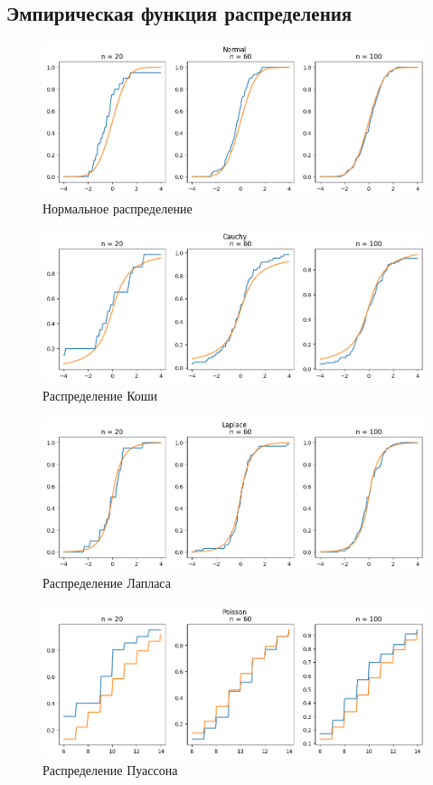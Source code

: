 \subsection{Эмпирическая функция распределения}

\begin{figure}[H]
	\includegraphics[width=\textwidth]{tasks/4/res/1.png}
	\caption{Нормальное распределение} 
\end{figure}
	
\begin{figure}[H]
	\includegraphics[width=\textwidth]{tasks/4/res/2.png}
	\caption{Распределение Коши} 
\end{figure}
	
\begin{figure}[H]
	\includegraphics[width=\textwidth]{tasks/4/res/3.png}
	\caption{Распределение Лапласа} 
\end{figure}
	
\begin{figure}[H]
	\includegraphics[width=\textwidth]{tasks/4/res/4.png}
	\caption{Распределение Пуассона} 
\end{figure}
	
